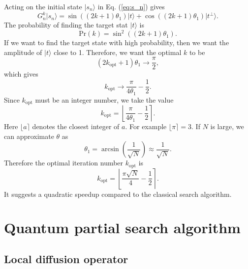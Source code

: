 \documentclass[a4paper,10pt]{article}
\newcommand{\pr}{\mathrm{Pr}}
\numberwithin{equation}{section}
\begin{document}
Acting on the initial state $|s_n\rangle$ in Eq. (\ref{eq:s_n}) gives
\begin{equation}
\label{eq:G_k_s_n}
    G_n^k|s_n\rangle = \sin((2k+1)\theta_1)|t\rangle + \cos((2k+1)\theta_1)|t^\perp\rangle.
\end{equation}
The probability of finding the target stat $|t\rangle$ is
\begin{equation}
\label{eq:pr_k}
    \pr(k) = \sin^2((2k+1)\theta_1).
\end{equation}
If we want to find the target state with high probability, then we want the amplitude of $|t\rangle$ close to 1. Therefore, we want the optimal $k$ to be
\begin{equation}
    (2k_\text{opt}+1)\theta_1 \rightarrow \frac \pi 2,
\end{equation}
which gives
\begin{equation}
    k_\text{opt} \rightarrow \frac{\pi}{4\theta_1} - \frac  1 2.
\end{equation}
Since $k_\text{opt}$ must be an integer number, we take the value
\begin{equation}
    k_\text{opt} = \left\lfloor \frac{\pi}{4\theta_1} - \frac  1 2\right\rceil.
\end{equation}
Here $\lfloor a \rceil$ denotes the closest integer of $a$. For example $\lfloor \pi \rceil = 3$. If $N$ is large, we can approximate $\theta$ as
\begin{equation}
    \theta_1 = \arcsin\left(\frac{1}{\sqrt N}\right) \approx \frac{1}{\sqrt N}.
\end{equation}
Therefore the optimal iteration number $k_\text{opt}$ is
\begin{equation}
    k_\text{opt} = \left\lfloor \frac{\pi\sqrt N}{4} - \frac  1 2\right\rceil.
\end{equation}
It suggests a quadratic speedup compared to the classical search algorithm. 


\section{Quantum partial search algorithm}

\subsection{Local diffusion operator}
\end{document}
